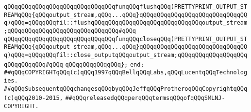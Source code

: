 \verb|qQQqqQQqqQQqqQQqqQQqqQQqqQQqqQQqfunqQQqflushqQQq(PRETTYPRINT_OUTPUT_STREAMqQQq{qQQqoutput_stream,qQQq...qQQq}qQQqqQQqqQQqqQQqqQQqqQQqqQQqqQQq)qQQq=qQQqqQQqfil::flushqQQqqQQqqQQqqQQqqQQqqQQqqQQqqQQqoutput_stream;qQQqqQQqqQQqqQQqqQQqqQQqqQQqqQQq#qQQq|\newline
\verb|qQQqqQQqqQQqqQQqqQQqqQQqqQQqqQQqfunqQQqcloseqQQq(PRETTYPRINT_OUTPUT_STREAMqQQq{qQQqoutput_stream,qQQq...qQQq}qQQqqQQqqQQqqQQqqQQqqQQqqQQqqQQq)qQQq=qQQqqQQqfil::close_outputqQQqoutput_stream;qQQqqQQqqQQqqQQqqQQqqQQqqQQqqQQq#qQQq|\newline
\verb|qQQqqQQqqQQqqQQq};|\newline
\verb|end;|\newline
\newline
\newline
\verb|##qQQqCOPYRIGHTqQQq(c)qQQq1997qQQqBellqQQqLabs,qQQqLucentqQQqTechnologies.|\newline
\verb|##qQQqSubsequentqQQqchangesqQQqbyqQQqJeffqQQqProtheroqQQqCopyrightqQQq(c)qQQq2010-2015,|\newline
\verb|##qQQqreleasedqQQqperqQQqtermsqQQqofqQQqSMLNJ-COPYRIGHT.|\newline

